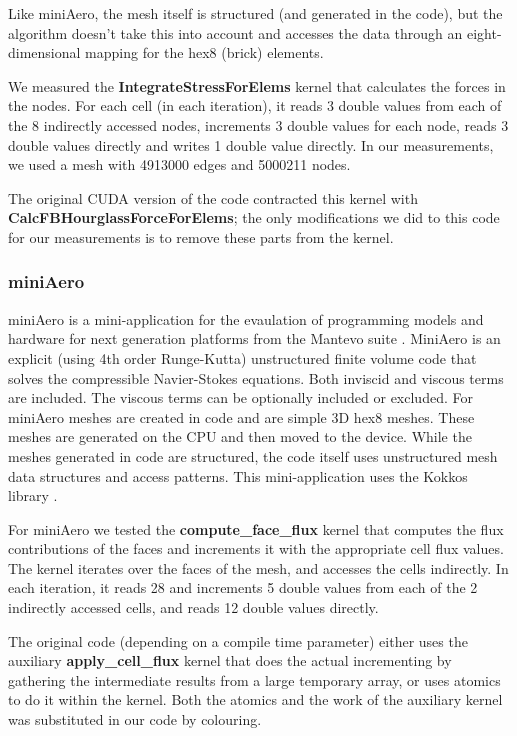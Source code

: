 Like miniAero, the mesh itself is structured (and generated in the code), but
the algorithm doesn't take this into account and accesses the data through an
eight-dimensional mapping for the hex8 (brick) elements.

We measured the \textbf{IntegrateStressForElems} kernel that calculates the
forces in the nodes. For each cell (in each iteration), it reads 3 double values
from each of the 8 indirectly accessed nodes, increments 3 double values for
each node, reads 3 double values directly and writes 1 double value directly. In
our measurements, we used a mesh with \num{4913000} edges and \num{5000211}
nodes.

The original CUDA version of the code contracted this kernel with
\textbf{CalcFBHourglassForceForElems}; the only modifications we did to this
code for our measurements is to remove these parts from the kernel.

\subsubsection{miniAero}\label{sec:mini-aero-summary}

miniAero \cite{miniaero} is a mini-application for the evaulation of programming
models and hardware for next generation platforms from the Mantevo suite
\cite{heroux2009improving}. MiniAero is an explicit (using 4th order
Runge-Kutta) unstructured finite volume code that solves the compressible
Navier-Stokes equations. Both inviscid and viscous terms are included. The
viscous terms can be optionally included or excluded. For miniAero meshes are
created in code and are simple 3D hex8 meshes. These meshes are generated on the
CPU and then moved to the device. While the meshes generated in code are
structured, the code itself uses unstructured mesh data structures and access
patterns. This mini-application uses the Kokkos library
\cite{CarterEdwards20143202}.

For miniAero we tested the \textbf{compute\_face\_flux} kernel that computes the
flux contributions of the faces and increments it with the appropriate cell flux
values. The kernel iterates over the faces of the mesh, and accesses the cells
indirectly. In each iteration, it reads 28 and increments 5 double values from
each of the 2 indirectly accessed cells, and reads 12 double values directly.

The original code (depending on a compile time parameter) either uses the
auxiliary \textbf{apply\_cell\_flux} kernel that does the actual incrementing by
gathering the intermediate results from a large temporary array, or uses atomics
to do it within the kernel. Both the atomics and the work of the auxiliary
kernel was substituted in our code by colouring.

